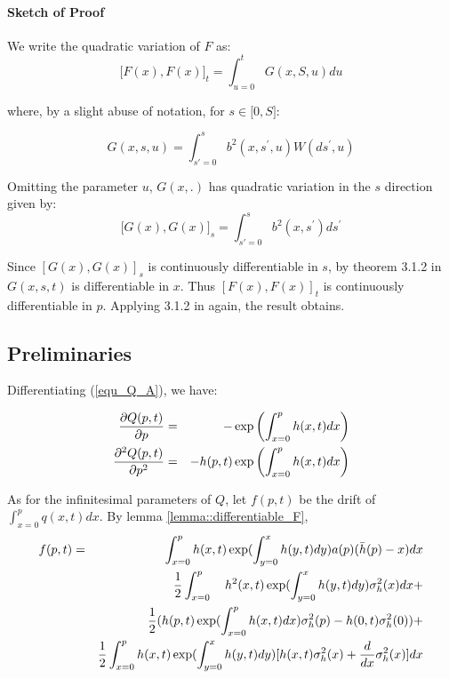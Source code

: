 \documentclass{article}
\begin{document}
\paragraph{Sketch of Proof}

We write the quadratic variation of $F$ as:%
\begin{equation*}
\lbrack F(x),F(x)]_{t}=\int_{u=0}^{t}G(x,S,u)du
\end{equation*}

where, by a slight abuse of notation, for $s\in \lbrack 0,S]$:

\begin{equation*}
G(x,s,u)=\int_{s'=0}^{s}b^{2}(x,s^{\prime },u)W(ds^{\prime },u)
\end{equation*}

Omitting the parameter $u$, $G(x,.)$ has quadratic variation in the $s$
direction given by:%
\begin{equation*}
\lbrack G(x),G(x)]_{s}=\int_{s'=0}^{s}b^{2}(x,s^{\prime })ds^{\prime }
\end{equation*}

Since $[G(x),G(x)]_{s}$ is continuously differentiable in $s$, by theorem
3.1.2 in \cite{Kun97} $G(x,s,t)$ is differentiable in $x$. Thus $[F(x),F(x)]_{t}$
is continuously differentiable in $p$. Applying 3.1.2 in \cite{Kun97} again, the
result obtains.

\subsection{Preliminaries}

Differentiating (\ref{equ_Q_A}), we have:

\begin{eqnarray}
\frac{\partial Q(p,t)}{\partial p} &=&-\exp \left( {\int_{x=0}^{p}h(x,t)dx}%
\right)  \label{dQdp_3} \\
\frac{\partial ^{2}Q(p,t)}{\partial p^{2}} &=&-{h(p,t)}\exp \left( {%
\int_{x=0}^{p}h(x,t)dx}\right)  \label{dQdp_2_3}
\end{eqnarray}

As for the infinitesimal parameters of $Q$, let $f(p,t)$ be the drift of $%
\int_{x=0}^{p}q(x,t)dx$. By lemma \ref{lemma::differentiable_F},
\begin{eqnarray}
f(p,t) &=&\int_{x=0}^{p}{h(x,t)}\exp ({\int_{y=0}^{x}h(y,t)dy)}a(p)(\bar{h}%
(p)-x)dx  \label{f_of_p} \\
&&\frac{1}{2}\int_{x=0}^{p}\text{ }{h}^{2}{(x,t)}\exp ({%
\int_{y=0}^{x}h(y,t)dy)}\sigma _{h}^{2}(x)dx+  \notag \\
&&\frac{1}{2}({h(p,t)}\exp ({\int_{x=0}^{p}h(x,t)dx)}\sigma _{h}^{2}(p)-{%
h(0,t)}\sigma _{h}^{2}(0))+  \notag \\
&&\frac{1}{2}\int_{x=0}^{p}{h(x,t)}\exp ({\int_{y=0}^{x}h(y,t)dy)[h(x,t)}%
\sigma _{h}^{2}(x)+\frac{d}{dx}\sigma _{h}^{2}(x)]dx  \notag
\end{eqnarray}
\end{document}
